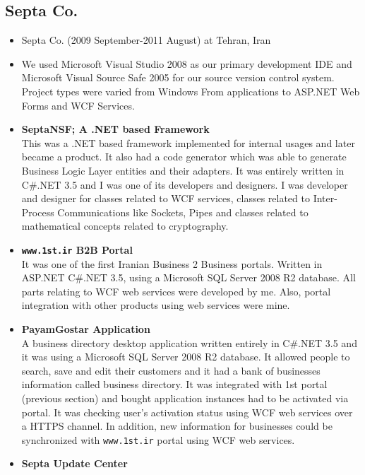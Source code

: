 \documentclass[12pt,a4paper]{article}
\begin{document}
	\subsection{Septa Co.}
		\begin{itemize}
			\item Septa Co. (2009 September-2011 August) at Tehran, Iran
			\item We used Microsoft Visual Studio 2008 as our primary development IDE and Microsoft Visual Source Safe 2005 for our source version control system. Project types were varied from Windows From applications to ASP.NET Web Forms and WCF Services.
			\item \small \textbf{SeptaNSF; A .NET based Framework} \\
			This was a .NET based framework implemented for internal usages and later became a product. It also had a code generator which was able to generate Business Logic Layer entities and their adapters. It was entirely written in C\#.NET 3.5 and I was one of its developers and designers. I was developer and designer for classes related to WCF services, classes related to Inter-Process Communications like Sockets, Pipes and classes related to mathematical concepts related to cryptography. \\
			\item \small \textbf{\texttt{www.1st.ir} B2B Portal} \\
			It was one of the first Iranian Business 2 Business portals. Written in ASP.NET C\#.NET 3.5, using a Microsoft SQL Server 2008 R2 database. All parts relating to WCF web services were developed by me. Also, portal integration with other products using web services were mine. \\
			\item \small \textbf{PayamGostar Application} \\
			A business directory desktop application written entirely in C\#.NET 3.5 and it was using a Microsoft SQL Server 2008 R2 database. It allowed people to search, save and edit their customers and it had a bank of businesses information called business directory. It was integrated with 1st portal (previous section) and bought application instances had to be activated via portal. It was checking user's activation status using WCF web services over a HTTPS channel. In addition, new information for businesses could be synchronized with \texttt{www.1st.ir} portal using WCF web services. \\
			\item \small \textbf{Septa Update Center} \\

\end{itemize}
\end{document}

